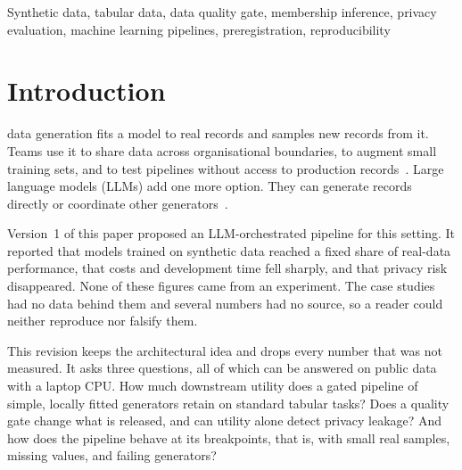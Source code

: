\documentclass[journal]{IEEEtran}
\begin{document}
\begin{IEEEkeywords}
Synthetic data, tabular data, data quality gate, membership inference, privacy evaluation, machine learning pipelines, preregistration, reproducibility
\end{IEEEkeywords}

\IEEEpeerreviewmaketitle

\section{Introduction}
\label{sec:intro}

 data generation fits a model to real records and samples new records from it. Teams use it to share data across organisational boundaries, to augment small training sets, and to test pipelines without access to production records~\cite{jordon2022synthetic,chen2021synthetic,hernandez2022synthetic}. Large language models (LLMs) add one more option. They can generate records directly or coordinate other generators~\cite{borisov2023great,long2024llm}.

Version~1 of this paper proposed an LLM-orchestrated pipeline for this setting. It reported that models trained on synthetic data reached a fixed share of real-data performance, that costs and development time fell sharply, and that privacy risk disappeared. None of these figures came from an experiment. The case studies had no data behind them and several numbers had no source, so a reader could neither reproduce nor falsify them.

This revision keeps the architectural idea and drops every number that was not measured. It asks three questions, all of which can be answered on public data with a laptop CPU. How much downstream utility does a gated pipeline of simple, locally fitted generators retain on standard tabular tasks? Does a quality gate change what is released, and can utility alone detect privacy leakage? And how does the pipeline behave at its breakpoints, that is, with small real samples, missing values, and failing generators?
\end{document}
